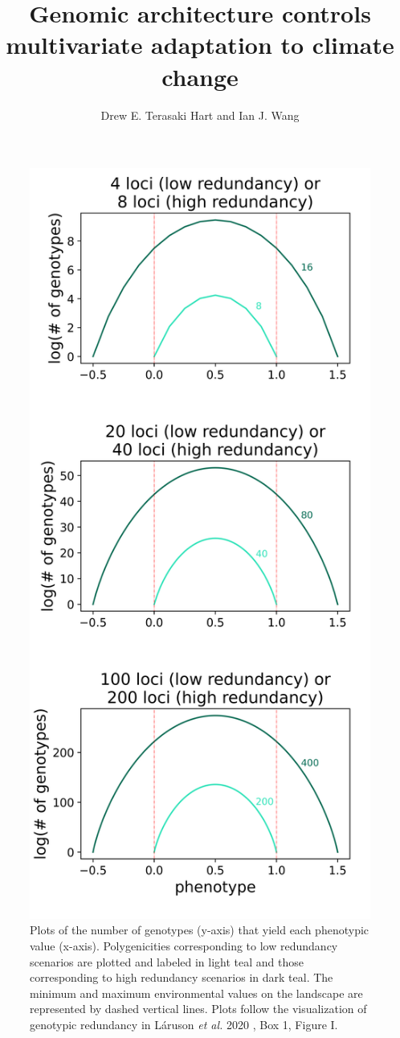 \documentclass[9pt,twoside,lineno]{new_article}
\title{Genomic architecture controls multivariate adaptation to climate change}
\author{Drew E. Terasaki Hart and Ian J. Wang}
\begin{document}
\maketitle




\begin{figure}
\centering
\includegraphics[width=.5\linewidth]{pub/figs_and_stats/FIG_S1_redundancy.png}
\caption{Plots of the number of genotypes (y-axis) that yield each phenotypic value (x-axis). Polygenicities corresponding to low redundancy scenarios are plotted and labeled in light teal and those corresponding to high redundancy scenarios in dark teal. The minimum and maximum environmental values on the landscape are represented by dashed vertical lines. Plots follow the visualization of genotypic redundancy in Láruson \textit{et al.} 2020 \cite{laruson}, Box 1, Figure I.
}
\label{fig:fig_s1}
\end{figure}
\end{document}
